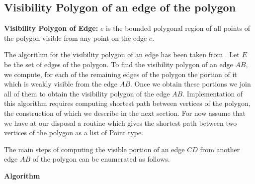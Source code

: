 \subsection{Visibility Polygon of an edge of the polygon}
\begin{definition}
 {\bf Visibility Polygon of Edge:} $e$ is the bounded polygonal region of all points of the polygon visible from any point on the edge $e$. 
\end{definition}

The algorithm for the visibility polygon of an edge has been taken from \cite{key3}.
Let $E$ be the set of edges of the polygon. To find the visibility polygon of an edge $AB$, we compute, for each of 
 the remaining edges of the polygon the portion of it which is weakly visible from the edge $AB$. Once we obtain these portions we join
 all of them to obtain the visibility polygon of the edge $AB$.
  Implementation of this algorithm requires computing shortest path between vertices of the polygon, the construction of which we 
describe in the next section. For now assume that we have at our disposal a routine which gives the shortest path between two vertices 
of the polygon as a list of Point type.

The main steps of computing the visible portion of an edge $CD$ from another edge $AB$ of the polygon can be enumerated as follows.

{\bf Algorithm}



